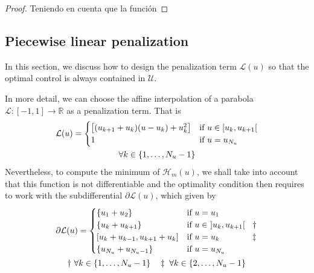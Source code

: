 \begin{proof}
    Teniendo en cuenta que la función 
\end{proof}

\subsection{Piecewise linear penalization}

In this section, we discuss how to design the penalization term $\mathcal{L}(u)$ so that the optimal control is always contained in $\mathcal{U}$. 

In more detail, we can choose the affine interpolation of a parabola $\mathcal{L}:[-1,1] \rightarrow \mathbb{R}$ as a penalization term. That is
\begin{gather}\label{PLP}
    {\mathcal{L}(u)} = \begin{cases}
        \big[ (u_{k+1}+u_{k}) (u-u_k) + u_k^2 \big] & \text{if}  u \in [u_k,u_{k+1}[ \\
        1 & \text{if} \ u = u_{N_u} 
    \end{cases} \\
    \notag \forall k \in \{1,\dots,N_u-1\}
\end{gather}
%
Nevertheless, to compute the minimum of $\mathcal{H}_m(u)$, we shall take into account that this function is not differentiable and the optimality condition then requires to work with the subdifferential $\partial\mathcal{L}(u)$, which given by
\begin{gather}
        \partial\mathcal{L}(u)= \begin{cases}
            \{u_1 + u_2  \}   & \text{if} \ u = u_1 \\
            \{u_k + u_{k+1}\}  & \text{if} \ u \in \ ]u_k,u_{k+1}[ \hspace{0.9em} \dagger\\
            [u_k+u_{k-1} ,  u_{k+1}+u_k] & \text{if} \ u = u_k \hspace{3.9em} \ddagger \\
            \{u_{N_u} + u_{N_u-1}  \} & \text{if} \ u = u_{N_u} 
       \end{cases} \\
       \notag \dagger \ \forall k \in \{1,\dots,N_u-1\} \hspace{1em}
       \notag \ddagger  \ \forall k \in \{2,\dots,N_u-1\}
\end{gather} 

